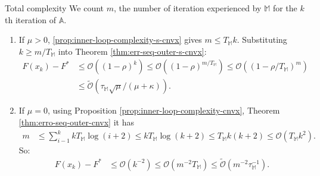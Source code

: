 \documentclass[11pt]{beamer}
\theoremstyle{definition}
\begin{document}
        \begin{frame}{Total complexity}
            We count $m$, the number of iteration experienced by $\mathbb M$ for the $k$ th iteration of $\mathbb A$. 
            \begin{enumerate}
                \item If $\mu > 0$, \ref{prop:inner-loop-complexity-s-cnvx} gives $m \le T_{\mathbb M}k$. 
                Substituting $k \ge m/T_{\mathbb M}$ into Theorem \ref{thm:err-seq-outer-s-cnvx}: 
                {\footnotesize
                \begin{align*}
                    F(x_k) - F^* &\le \mathcal O \left(
                        (1 - \rho)^k 
                    \right) \le 
                    \mathcal O \left(
                        (1 - \rho)^{m/ T_{\mathbb M}}
                    \right) \le 
                    \mathcal O\left(
                        \left(1 - \rho/T_{\mathbb M}\right)^{m}
                    \right)
                    \\
                    &\le \widetilde{\mathcal O}\left(
                        \tau_{\mathbb M}\sqrt{\mu}/(\mu + \kappa)
                    \right). 
                \end{align*}
                }
                \item If $\mu = 0$, using Proposition \ref{prop:inner-loop-complexity-cnvx}, Theorem \ref{thm:erro-seq-outer-cnvx} it has 
                {\footnotesize
                \begin{align*}
                    m &\le \sum_{i - 1}^{k} k T_{\mathbb M} \log(i + 2) \le k T_{\mathbb M} \log(k + 2) 
                    \le T_{\mathbb M}k(k + 2) 
                    \le 
                    \mathcal O(T_{\mathbb M} k^2). 
                \end{align*}
                So: 
                \begin{align*}
                    F(x_k)- F^* &\le 
                    \mathcal O(k^{-2})\le 
                    \mathcal O
                        \left(
                            m^{-2}T_{\mathbb M}
                        \right) 
                        \le \widetilde{\mathcal O}
                            \left(m^{-2}\tau_{\mathbb M}^{-1}\right). 
                \end{align*}
                }
            \end{enumerate}
        \end{frame}
\end{document}
